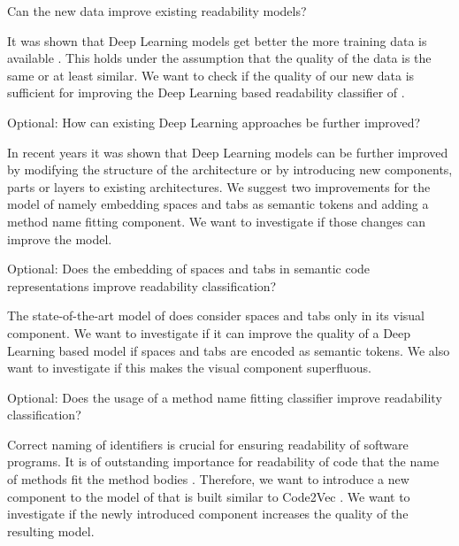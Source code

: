 \documentclass[%
class=scrreprt,
chapterprefix=false,%
open=right,%
twoside=false,%
paper=a4,%
logofile={Logo\_zentral\_farbig\_EN.png},%
thesistype=masterproposal,%
UKenglish,%
]{se2thesis}
\begin{document}
	\begin{resq}Can the new data improve existing readability models?\end{resq} \label{RQ2}
	It was shown that Deep Learning models get better the more training data is available \cite{hestness2017deep}. This holds under the assumption that the quality of the data is the same or at least similar. We want to check if the quality of our new data is sufficient for improving the Deep Learning based readability classifier of \citeauthor{mi2022towards} \cite{mi2022towards}.    
	
	\begin{resq}Optional: How can existing Deep Learning approaches be further improved?\end{resq} \label{RQ3}
	In recent years it was shown that Deep Learning models can be further improved by modifying the structure of the architecture or by introducing new components, parts or layers to existing architectures. We suggest two improvements for the model of \citeauthor{mi2022towards} \cite{mi2022towards} namely embedding spaces and tabs as semantic tokens and adding a method name fitting component. We want to investigate if those changes can improve the model.
	
	\begin{resq}Optional: Does the embedding of spaces and tabs in semantic code representations improve readability classification?\end{resq} \label{RQ3.1}
	The state-of-the-art model of \citeauthor{mi2022towards} \cite{mi2022towards} does consider spaces and tabs only in its visual component. We want to investigate if it can improve the quality of a Deep Learning based model if spaces and tabs are encoded as semantic tokens. We also want to investigate if this makes the visual component superfluous.
	
	\begin{resq}Optional: Does the usage of a method name fitting classifier improve readability classification?\end{resq} \label{RQ3.2}
	Correct naming of identifiers is crucial for ensuring readability of software programs. It is of outstanding importance for readability of code that the name of methods fit the method bodies \cite{liu2019learning}. Therefore, we want to introduce a new component to the model of \citeauthor{mi2022towards} \cite{mi2022towards} that is built similar to Code2Vec \cite{alon2019code2vec}. We want to investigate if the newly introduced component increases the quality of the resulting model.
	
	\backmatter
	
	\printbibliography
	
\end{document}
